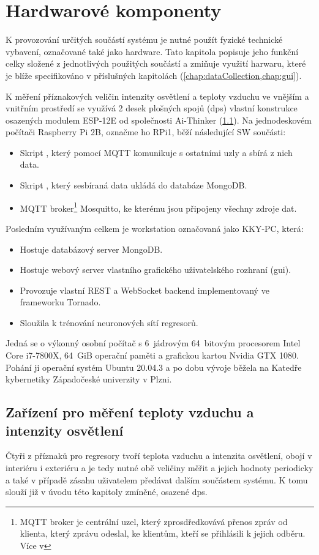 \chapter{Hardwarové komponenty} \label{chap:hw}
K provozování určitých součástí systému je nutné použít fyzické technické vybavení, označované také jako hardware. Tato kapitola popisuje jeho funkční celky složené z jednotlivých použitých součástí a zmiňuje využití harwaru, které je blíže specifikováno v příslušných kapitolách (\cref{chap:dataCollection,chap:gui}).

K měření příznakových veličin intenzity osvětlení a teploty vzduchu ve vnějším a vnitřním prostředí se využívá 2 desek plošných spojů (\acrshort{dps}) vlastní konstrukce osazených modulem ESP-12E od společnosti Ai-Thinker (\cref{sec:senzory}). Na jednodeskovém počítači Raspberry Pi 2B, označme ho RPi1, běží následující SW součásti:
\begin{itemize}
    \item Skript , který pomocí MQTT komunikuje s ostatními uzly a sbírá z nich data.
    \item Skript , který sesbíraná data ukládá do databáze MongoDB.
    \item MQTT broker\footnote{MQTT broker je centrální uzel, který zprosdředkovává přenos zpráv od klienta, který zprávu odeslal, ke klientům, kteří se přihlásili k jejich odběru. Více v } Mosquitto, ke kterému jsou připojeny všechny zdroje dat.
\end{itemize}
\label{list:rpi}
Posledním využívaným celkem je workstation označovaná jako KKY-PC, která:
\begin{itemize}
    \item Hostuje databázový server MongoDB.
    \item Hostuje webový server vlastního grafického uživatelského rozhraní (\acrshort{gui}).
    \item Provozuje vlastní REST a WebSocket backend implementovaný ve frameworku Tornado.
    \item Sloužila k trénování neuronových sítí regresorů.
\end{itemize}
Jedná se o výkonný osobní počítač s 6~jádrovým 64~bitovým procesorem Intel Core i7-7800X, 64~GiB operační paměti a grafickou kartou Nvidia GTX 1080. Pohání ji operační systém Ubuntu 20.04.3 a po dobu vývoje běžela na Katedře kybernetiky Západočeské univerzity v Plzni.

\section{Zařízení pro měření teploty vzduchu a intenzity osvětlení} \label{sec:senzory} %
    Čtyři z příznaků pro regresory tvoří teplota vzduchu a intenzita osvětlení, obojí v interiéru i exteriéru a je tedy nutné obě veličiny měřit a jejich hodnoty periodicky a také v případě zásahu uživatelem předávat dalším součástem systému. K tomu slouží již v úvodu této kapitoly zmíněné, osazené \acrshort{dps}.
    
